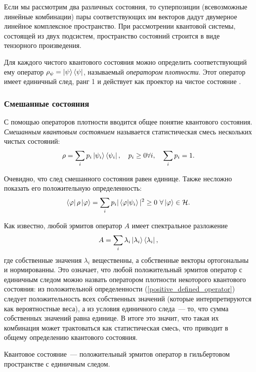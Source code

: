 Если мы рассмотрим два различных состояния, то суперпозиции (всевозможные линейные комбинации) пары соответствующих им векторов дадут двумерное линейное комплексное пространство.
При рассмотрении квантовой системы, состоящей из двух подсистем, пространство состояний строится в виде тензорного произведения. 

Для каждого чистого квантового состояния \state{\psi} можно определить соответствующий ему оператор
$\rho_\psi = \left| \psi \right\rangle \left\langle \psi \right|$, называемый \textit{оператором плотности}.
Этот оператор имеет единичный след, ранг 1 и действует как проектор на чистое состояние \state{\psi}.

\subsubsection{Смешанные состояния}
С помощью операторов плотности вводится общее понятие квантового состояния. \textit{Смешанным квантовым состоянием} называется статистическая смесь нескольких чистых состояний:
\begin{equation}
  \rho = \sum_i p_i \left| \psi_i \right\rangle\left\langle \psi_i \right|, \quad p_i \ge 0 \forall i, \quad \sum_i p_i = 1.
\end{equation}

Очевидно, что след смешанного состояния равен единице. Также несложно показать его положительную определенность:
\begin{equation}\label{positive_defined_operator}
  \left\langle \varphi \right|\rho\left| \varphi \right\rangle = \sum_i p_i |\left\langle \varphi|\psi_i\right\rangle|^2 \ge 0 \ \forall \left| \varphi \right\rangle \in \mathcal{H}.
\end{equation}

Как известно, любой эрмитов оператор $A$ имеет спектральное разложение
\begin{equation}
  A = \sum_i \lambda_i \left| \lambda_i \right\rangle\left\langle \lambda_i \right|,
\end{equation}
где собственные значения $\lambda_i$ вещественны, а собственные векторы  ортогональны и нормированны. Это означает, что любой положительный эрмитов оператор с единичным следом можно назвать оператором плотности некоторого квантового состояния: из положительной определенности (\ref{positive_defined_operator}) следует положительность всех собственных значений (которые интерпретируются как вероятностные веса), а из условия единичного следа~--- то, что сумма собственных значений равна единице. В итоге это значит, что такая их комбинация может трактоваться как статистическая смесь, что приводит в общему определению квантового состояния.
\begin{definition}
  Квантовое состояние~--- положительный эрмитов оператор в гильбертовом пространстве с единичным следом.
\end{definition}


